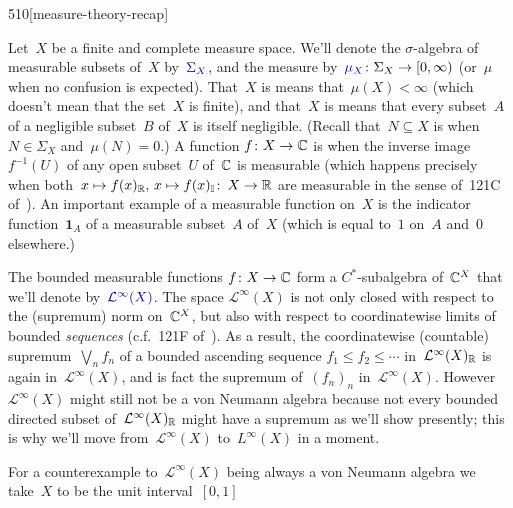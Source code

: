 \begin{parsec}{510}[measure-theory-recap]%
\begin{point}{10}%
Let~$X$ be a finite and complete measure space.
We'll denote the $\sigma$-algebra
of measurable subsets of~$X$ by~$\Define{\Sigma_X}$,%
and the measure by~$\Define{\mu_X}\colon \Sigma_X\to[0,\infty)$ (or~$\mu$%
when no confusion is expected).
That~$X$ is %
means that~$\mu(X)<\infty$
(which doesn't mean that the set~$X$ is finite),
and that~$X$ is %
means that every subset~$A$
of a negligible subset~$B$ of~$X$
is itself negligible.
(Recall that~$N\subseteq X$
is %
when~$N\in \Sigma_X$ and~$\mu(N)=0$.)
A function $f\colon X\to\mathbb{C}$ is %
when the inverse image~$f^{-1}(U)$
of any open subset~$U$ of~$\mathbb{C}$
is measurable
(which happens precisely
when both~$x\mapsto f(x)_{\mathbb{R}},\,x\mapsto f(x)_{\mathbb{I}}\colon\,
X\to\mathbb{R}$
are measurable in the sense of~121C of~\cite{fremlin}).
An important example of a measurable function on~$X$
is the indicator function~$\mathbf{1}_A$
of a measurable subset~$A$ of~$X$
(which is equal to~$1$ on~$A$ and~$0$ elsewhere.)
\end{point}
\begin{point}{20}%
The bounded measurable functions $f\colon X\to\mathbb{C}$
form a $C^*$-subalgebra of~$\mathbb{C}^X$ 
that we'll denote by~$\Define{\mathcal{L}^\infty(X)}$.%
The space $\mathcal{L}^\infty(X)$
is not only closed with respect to the (supremum) norm
on~$\mathbb{C}^X$,
but also with respect to coordinatewise limits
of bounded \emph{sequences}
(c.f.~121F of~\cite{fremlin}).
As a result,
the coordinatewise
(countable)
supremum~$\bigvee_n f_n$
of a bounded ascending sequence $f_1\leq f_2\leq \dotsb$
in~$\mathcal{L}^\infty(X)_{\mathbb{R}}$
is again in~$\mathcal{L}^\infty(X)$,
and is fact the supremum of~$(f_n)_n$ in~$\mathcal{L}^\infty(X)$.
However $\mathcal{L}^\infty(X)$
might still not be a von Neumann algebra
because not every bounded directed subset of~$\mathcal{L}^\infty(X)_{\mathbb{R}}$
might have a supremum
as we'll show presently; 
this is why we'll move from~$\mathcal{L}^\infty(X)$
to~$L^\infty(X)$ in a moment.
\end{point}
\begin{point}{30}%
For a counterexample
to~$\mathcal{L}^\infty(X)$ being always
a von Neumann algebra
we take~$X$ to be the unit interval~$[0,1]$

\end{point}
\end{parsec}
